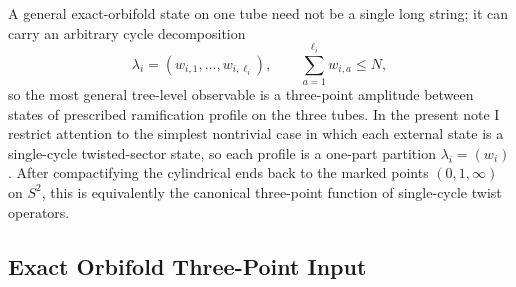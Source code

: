 \documentclass[11pt]{article}
\begin{document}
A general exact-orbifold state on one tube need not be a single long string; it can carry an arbitrary cycle decomposition
\begin{equation}\label{eq:ramification-profile}
\lambda_i=(w_{i,1},\dots,w_{i,\ell_i}),
\qquad
\sum_{a=1}^{\ell_i} w_{i,a}\le N,
\end{equation}
so the most general tree-level observable is a three-point amplitude between states of prescribed ramification profile on the three tubes. In the present note I restrict attention to the simplest nontrivial case in which each external state is a single-cycle twisted-sector state, so each profile is a one-part partition $\lambda_i=(w_i)$. After compactifying the cylindrical ends back to the marked points $(0,1,\infty)$ on $S^2$, this is equivalently the canonical three-point function of single-cycle twist operators.

\subsection{Exact Orbifold Three-Point Input}
\end{document}

